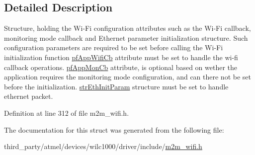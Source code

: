 \subsection{Detailed Description}
Structure, holding the Wi-\/\+Fi configuration attributes such as the Wi-\/\+Fi callback, monitoring mode callback and Ethernet parameter initialization structure. Such configuration parameters are required to be set before calling the Wi-\/\+Fi initialization function \hyperlink{group__WifiSetCustInfoElementFn_ga13d5fa7a0c71fd59bbf36a61923835cc}{pf\+App\+Wifi\+Cb} attribute must be set to handle the wi-\/fi callback operations. \hyperlink{group__WifiSetCustInfoElementFn_gabbd16bbde19ebb6cea2ff732b84421e8}{pf\+App\+Mon\+Cb} attribute, is optional based on wether the application requires the monitoring mode configuration, and can there not be set before the initialization. \hyperlink{group__WifiSetCustInfoElementFn_gac72757e663d13b9c446735a5dca54eb1}{str\+Eth\+Init\+Param} structure must be set to handle ethernet packet. 

Definition at line 312 of file m2m\+\_\+wifi.\+h.



The documentation for this struct was generated from the following file\+:\begin{DoxyCompactItemize}
\item 
third\+\_\+party/atmel/devices/wilc1000/driver/include/\hyperlink{m2m__wifi_8h}{m2m\+\_\+wifi.\+h}\end{DoxyCompactItemize}
